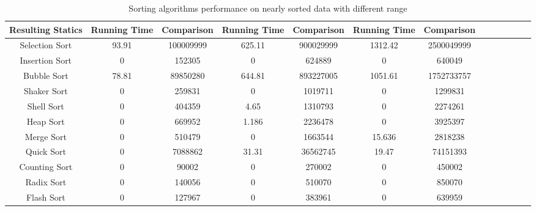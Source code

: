 \documentclass[11pt,a4paper]{article}
\begin{document}
{\begin{table}[H]
{\begin{tabular}{|c|c|c|c|c|c|c|c|c|c|c|c|c|}
		 \hline
		 Resulting Statics & Running Time & Comparison & Running Time & Comparison & Running Time & Comparison\\
		 \hline
		 Selection Sort & 93.91 & 100009999 & 625.11 & 900029999 & 1312.42 & 2500049999\\
		 \hline
		 Insertion Sort & 0 & 152305 & 0 & 624889 & 0 & 640049\\
		 \hline
		 Bubble Sort 	& 78.81 & 89850280 & 644.81 & 893227005 & 1051.61 & 1752733757\\
		 \hline
		 Shaker Sort 	& 0 & 259831 & 0 & 1019711 & 0 & 1299831\\
		 \hline
		 Shell Sort		& 0 & 404359 & 4.65 & 1310793 & 0 & 2274261\\
		 \hline
		 Heap Sort		& 0 & 669952 & 1.186 & 2236478 & 0 & 3925397\\
		 \hline
		 Merge Sort		& 0 & 510479 & 0 & 1663544 & 15.636 & 2818238\\
		 \hline
		 Quick Sort		& 0 & 7088862 & 31.31 & 36562745 & 19.47 & 74151393\\
		 \hline
		 Counting Sort 	& 0 & 90002 & 0 & 270002 & 0 & 450002\\
		 \hline
		 Radix Sort 	& 0 & 140056 & 0 & 510070 & 0 & 850070\\
		 \hline
		 Flash Sort 	& 0 & 127967 & 0 & 383961 & 0 & 639959\\
		 \hline
		\end{tabular}}
		\caption{Sorting algorithms performance on nearly sorted data with different range}
		\end{table}
		
}
\end{document}
